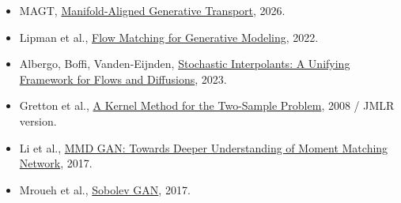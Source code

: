 \documentclass[UTF8,11pt]{ctexart}
\begin{document}
\begin{itemize}[leftmargin=2em]
\item MAGT, \href{https://arxiv.org/abs/2602.19600}{Manifold-Aligned Generative Transport}, 2026.
\item Lipman et al., \href{https://arxiv.org/abs/2210.02747}{Flow Matching for Generative Modeling}, 2022.
\item Albergo, Boffi, Vanden-Eijnden, \href{https://arxiv.org/abs/2303.08797}{Stochastic Interpolants: A Unifying Framework for Flows and Diffusions}, 2023.
\item Gretton et al., \href{https://arxiv.org/abs/0805.2368}{A Kernel Method for the Two-Sample Problem}, 2008 / JMLR version.
\item Li et al., \href{https://arxiv.org/abs/1705.08584}{MMD GAN: Towards Deeper Understanding of Moment Matching Network}, 2017.
\item Mroueh et al., \href{https://arxiv.org/abs/1711.04894}{Sobolev GAN}, 2017.
\end{itemize}
\end{document}
